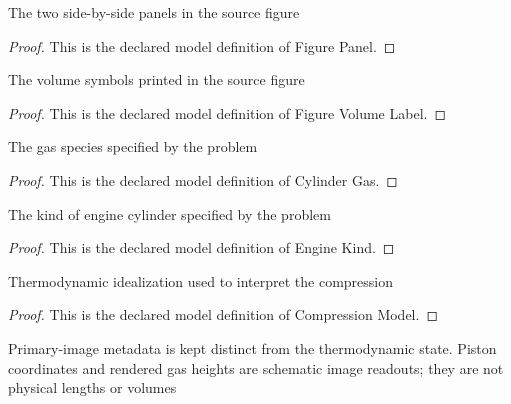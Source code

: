 \begin{definition}
  \label{def:physics:phyx-mini-0472:phyxminiproblems-problemphyxmini0472-figurepanel}
  The two side-by-side panels in the source figure
\end{definition}
\begin{proof}
  This is the declared model definition of Figure Panel.
\end{proof}
\begin{definition}
  \label{def:physics:phyx-mini-0472:phyxminiproblems-problemphyxmini0472-figurevolumelabel}
  The volume symbols printed in the source figure
\end{definition}
\begin{proof}
  This is the declared model definition of Figure Volume Label.
\end{proof}
\begin{definition}
  \label{def:physics:phyx-mini-0472:phyxminiproblems-problemphyxmini0472-cylindergas}
  The gas species specified by the problem
\end{definition}
\begin{proof}
  This is the declared model definition of Cylinder Gas.
\end{proof}
\begin{definition}
  \label{def:physics:phyx-mini-0472:phyxminiproblems-problemphyxmini0472-enginekind}
  The kind of engine cylinder specified by the problem
\end{definition}
\begin{proof}
  This is the declared model definition of Engine Kind.
\end{proof}
\begin{definition}
  \label{def:physics:phyx-mini-0472:phyxminiproblems-problemphyxmini0472-compressionmodel}
  Thermodynamic idealization used to interpret the compression
\end{definition}
\begin{proof}
  This is the declared model definition of Compression Model.
\end{proof}
\begin{definition}
  \label{def:physics:phyx-mini-0472:phyxminiproblems-problemphyxmini0472-dieselcompressionfigure}
  Primary-image metadata is kept distinct from the thermodynamic state. Piston coordinates and rendered gas heights are schematic image readouts; they are not physical lengths or volumes
\end{definition}
